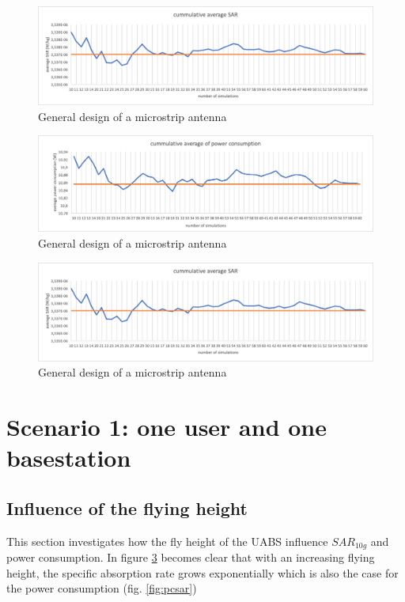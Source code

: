 \begin{figure}[th!]
  \includegraphics[width=\textwidth]{../results/numberOfSim/sarvssim.png}
  \caption{General design of a microstrip antenna}
  \label{fig:fhsar}
\end{figure}
\begin{figure}[th!]
  \includegraphics[width=\textwidth]{../results/numberOfSim/pcvssim.png}
  \caption{General design of a microstrip antenna}
  \label{fig:fhsar}
\end{figure}
\begin{figure}[th!]
  \includegraphics[width=\textwidth]{../results/numberOfSim/sarvssim.png}
  \caption{General design of a microstrip antenna}
  \label{fig:fhsar}
\end{figure}

\section{Scenario 1: one user and one basestation}


\subsection{Influence of the flying height}
\label{sub:senario1_influenceOfFlyHeight}

This section investigates how the fly height of the \gls{UABS} influence $SAR_{10g}$ and power consumption. In figure \ref{fig:fhsar}
becomes clear that with an increasing flying height, the specific absorption rate grows exponentially 
which is also the case for the power consumption (fig. \ref{fig:pcsar})  

